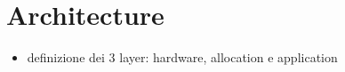 \chapter{Architecture}
\label{chap:architecture}

\begin{itemize}
    \item definizione dei 3 layer: hardware, allocation e application
\end{itemize}

